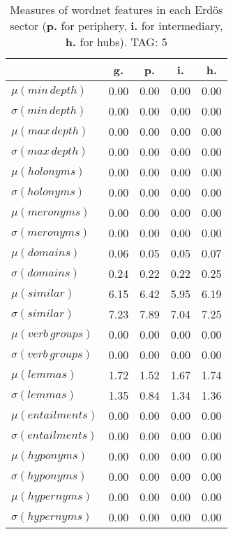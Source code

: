 \begin{table}[h!]
\begin{center}
\begin{tabular}{| l || c | c | c | c |}\hline
 & {\bf g.} & {\bf p.} & {\bf i.} & {\bf h.} \\\hline\hline
$\mu(min\,depth)$ & 0.00  & 0.00  & 0.00  & 0.00 \\
$\sigma(min\,depth)$ & 0.00  & 0.00  & 0.00  & 0.00 \\\hline
$\mu(max\,depth)$ & 0.00  & 0.00  & 0.00  & 0.00 \\
$\sigma(max\,depth)$ & 0.00  & 0.00  & 0.00  & 0.00 \\\hline
$\mu(holonyms)$ & 0.00  & 0.00  & 0.00  & 0.00 \\
$\sigma(holonyms)$ & 0.00  & 0.00  & 0.00  & 0.00 \\\hline
$\mu(meronyms)$ & 0.00  & 0.00  & 0.00  & 0.00 \\
$\sigma(meronyms)$ & 0.00  & 0.00  & 0.00  & 0.00 \\\hline
$\mu(domains)$ & 0.06  & 0.05  & 0.05  & 0.07 \\
$\sigma(domains)$ & 0.24  & 0.22  & 0.22  & 0.25 \\\hline
$\mu(similar)$ & 6.15  & 6.42  & 5.95  & 6.19 \\
$\sigma(similar)$ & 7.23  & 7.89  & 7.04  & 7.25 \\\hline
$\mu(verb\,groups)$ & 0.00  & 0.00  & 0.00  & 0.00 \\
$\sigma(verb\,groups)$ & 0.00  & 0.00  & 0.00  & 0.00 \\\hline
$\mu(lemmas)$ & 1.72  & 1.52  & 1.67  & 1.74 \\
$\sigma(lemmas)$ & 1.35  & 0.84  & 1.34  & 1.36 \\\hline
$\mu(entailments)$ & 0.00  & 0.00  & 0.00  & 0.00 \\
$\sigma(entailments)$ & 0.00  & 0.00  & 0.00  & 0.00 \\\hline
$\mu(hyponyms)$ & 0.00  & 0.00  & 0.00  & 0.00 \\
$\sigma(hyponyms)$ & 0.00  & 0.00  & 0.00  & 0.00 \\\hline
$\mu(hypernyms)$ & 0.00  & 0.00  & 0.00  & 0.00 \\
$\sigma(hypernyms)$ & 0.00  & 0.00  & 0.00  & 0.00 \\\hline
\end{tabular}
\caption{Measures of wordnet features in each Erd\"os sector ({{\bf p.}} for periphery, {{\bf i.}} for intermediary, {{\bf h.}} for hubs). TAG: 5}
\end{center}
\end{table}